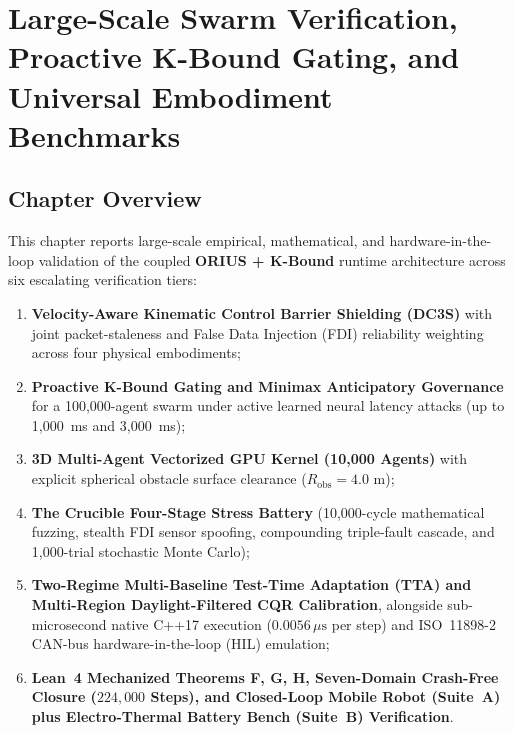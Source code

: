 \chapter[Large-Scale Swarm \& K-Bound Benchmarks]{Large-Scale Swarm Verification, Proactive K-Bound Gating, and Universal Embodiment Benchmarks}
\label{ch:large_scale_benchmarks}

\section{Chapter Overview}
This chapter reports large-scale empirical, mathematical, and hardware-in-the-loop validation of the coupled \textbf{ORIUS + K-Bound} runtime architecture across six escalating verification tiers:
\begin{enumerate}
    \item \textbf{Velocity-Aware Kinematic Control Barrier Shielding (DC3S)} with joint packet-staleness and False Data Injection (FDI) reliability weighting across four physical embodiments;
    \item \textbf{Proactive K-Bound Gating and Minimax Anticipatory Governance} for a 100,000-agent swarm under active learned neural latency attacks (up to 1,000~ms and 3,000~ms);
    \item \textbf{3D Multi-Agent Vectorized GPU Kernel (10,000 Agents)} with explicit spherical obstacle surface clearance ($R_{\mathrm{obs}} = 4.0\text{ m}$);
    \item \textbf{The Crucible Four-Stage Stress Battery} (10,000-cycle mathematical fuzzing, stealth FDI sensor spoofing, compounding triple-fault cascade, and 1,000-trial stochastic Monte Carlo);
    \item \textbf{Two-Regime Multi-Baseline Test-Time Adaptation (TTA) and Multi-Region Daylight-Filtered CQR Calibration}, alongside sub-microsecond native C++17 execution ($0.0056\,\mu\text{s}$ per step) and ISO~11898-2 CAN-bus hardware-in-the-loop (HIL) emulation;
    \item \textbf{Lean~4 Mechanized Theorems F, G, H, Seven-Domain Crash-Free Closure ($224,000$ Steps), and Closed-Loop Mobile Robot (Suite~A) plus Electro-Thermal Battery Bench (Suite~B) Verification}.
\end{enumerate}

